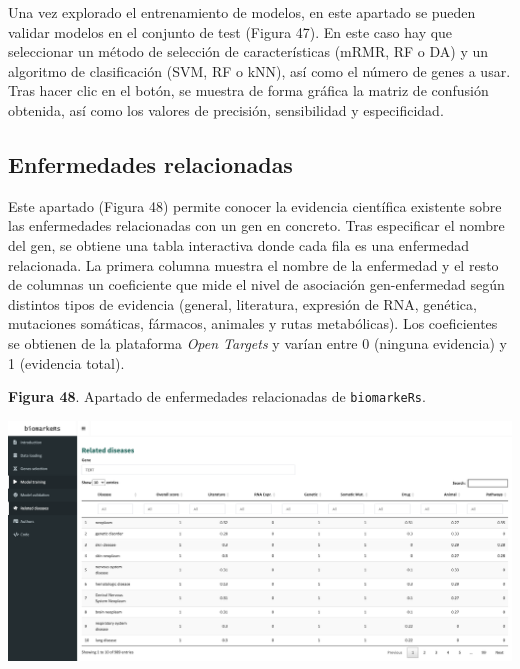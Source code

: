 Una vez explorado el entrenamiento de modelos, en este apartado se pueden validar modelos en el conjunto de test (Figura 47). En este caso hay que seleccionar un método de selección de características (mRMR, RF o DA) y un algoritmo de clasificación (SVM, RF o kNN), así como el número de genes a usar. Tras hacer clic en el botón, se muestra de forma gráfica la matriz de confusión obtenida, así como los valores de precisión, sensibilidad y especificidad.

\newpage
\subsection{Enfermedades relacionadas}

Este apartado (Figura 48) permite conocer la evidencia científica existente sobre las enfermedades relacionadas con un gen en concreto. Tras especificar el nombre del gen, se obtiene una tabla interactiva donde cada fila es una enfermedad relacionada. La primera columna muestra el nombre de la enfermedad y el resto de columnas un coeficiente que mide el nivel de asociación gen-enfermedad según distintos tipos de evidencia (general, literatura, expresión de RNA, genética, mutaciones somáticas, fármacos, animales y rutas metabólicas). Los coeficientes se obtienen de la plataforma \textit{Open Targets} \cite{OpenTargets2020} y varían entre 0 (ninguna evidencia) y 1 (evidencia total).

\begin{center}
	\textbf{Figura 48}. Apartado de enfermedades relacionadas de \texttt{biomarkeRs}.
\end{center}

\begin{center}
	\includegraphics[width=.90\textwidth]{figuras/48_related_diseases.png} \\
\end{center}

